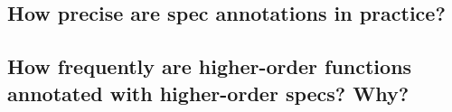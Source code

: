 \subsection{How precise are spec annotations in practice?}

\subsection{How frequently are higher-order functions annotated with higher-order specs? Why?}







